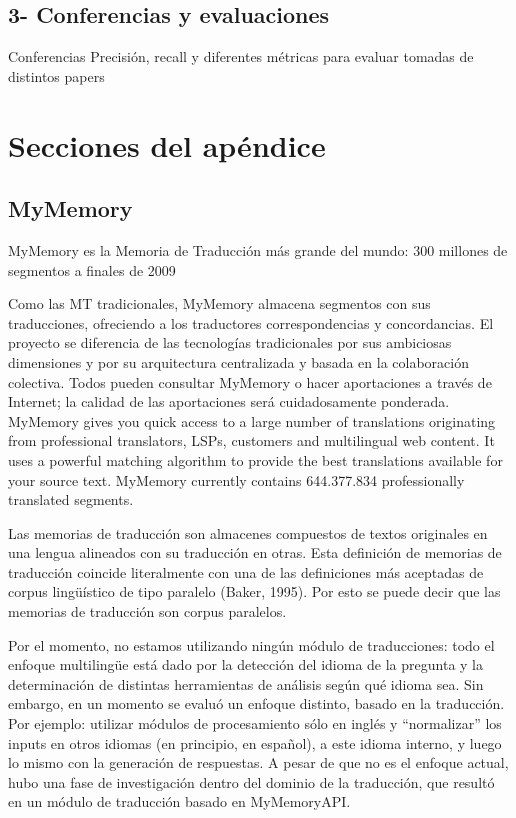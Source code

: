 \subsection{3- Conferencias y evaluaciones}
Conferencias
Precisión, recall y diferentes métricas para evaluar tomadas de distintos papers

\section{Secciones del apéndice}

\subsection{MyMemory}
MyMemory es la Memoria de Traducción más grande del mundo: 300 millones de segmentos a finales de 2009

Como las MT tradicionales, MyMemory almacena segmentos con sus traducciones, ofreciendo a los traductores correspondencias y concordancias. El proyecto se diferencia de las tecnologías tradicionales por sus ambiciosas dimensiones y por su arquitectura centralizada y basada en la colaboración colectiva. Todos pueden consultar MyMemory o hacer aportaciones a través de Internet; la calidad de las aportaciones será cuidadosamente ponderada.
MyMemory gives you quick access to a large number of translations originating from professional translators, LSPs, customers and multilingual web content. It uses a powerful matching algorithm to provide the best translations available for your source text. MyMemory currently contains 644.377.834 professionally translated segments.

Las memorias de traducción son almacenes compuestos de textos originales en una lengua alineados con su traducción en otras. Esta definición de memorias de traducción coincide literalmente con una de las definiciones más aceptadas de corpus lingüístico de tipo paralelo (Baker, 1995). Por esto se puede decir que las memorias de traducción son corpus paralelos.


Por el momento, no estamos utilizando ningún módulo de traducciones:
todo el enfoque multilingüe está dado por la detección del idioma
de la pregunta y la determinación de distintas herramientas de
análisis según qué idioma sea. Sin embargo, en un momento se
evaluó un enfoque distinto, basado en la traducción. Por ejemplo:
utilizar módulos de procesamiento sólo en inglés y
{\textquotedblleft}normalizar{\textquotedblright} los inputs en otros
idiomas (en principio, en espa\~nol), a este idioma interno, y luego lo
mismo con la generación de respuestas. A pesar de que no es el
enfoque actual, hubo una fase de investigación dentro del dominio de
la traducción, que resultó en un módulo de traducción basado en
MyMemoryAPI.

